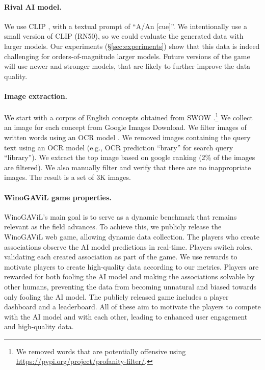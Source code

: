 \documentclass{article}
\newcommand{\ouracronym}[0]{WinoGAViL}
\begin{document}
\paragraph{Rival AI model.} We use CLIP \cite{radford2021learning}, with a textual prompt of ``A/An [cue]''. We intentionally use a small version of CLIP (RN50), so we could evaluate the generated data with larger models. Our experiments (\S\ref{sec:experiments}) show that this data is indeed challenging for orders-of-magnitude larger models. Future versions of the game will use newer and stronger models, that are likely to further improve the data quality.

\paragraph{Image extraction.} 
\label{sec:image_extraction}
We start with a corpus of English concepts obtained from SWOW \cite{de2019small}.\footnote{We removed words that are potentially offensive using \url{https://pypi.org/project/profanity-filter/}.} We collect an image for each concept from Google Images Download. We filter images of written words using an OCR model \cite{baek2019character}. We removed images containing the query text using an OCR model (e.g., OCR prediction ``brary'' for search query ``library''). We extract the top image based on google ranking (2\% of the images are filtered). We also manually filter and verify that there are no inappropriate images. The result is a set of 3K images. 

\paragraph{\ouracronym{} game properties.} \ouracronym{}'s main goal is to serve as a dynamic benchmark that remains relevant as the field advances. To achieve this, we publicly release the \ouracronym{} web game, allowing dynamic data collection. The players who create associations observe the AI model predictions in real-time. Players switch roles, validating each created association as part of the game. We use rewards to motivate players to create high-quality data according to our metrics. Players are rewarded for both fooling the AI model and making the associations solvable by other humans, preventing the data from becoming unnatural and biased towards only fooling the AI model. The publicly released game includes a player dashboard and a leaderboard. All of these aim to motivate the players to compete with the AI model and with each other, leading to enhanced user engagement and high-quality data. 
\end{document}
